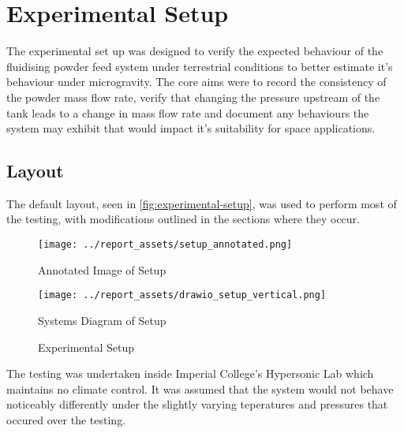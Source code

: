 \section{Experimental Setup}
The experimental set up was designed to verify the expected behaviour of the fluidising powder feed system under terrestrial conditions to better estimate it's behaviour under microgravity. The core aims were to record the consistency of the powder mass flow rate, verify that changing the pressure upstream of the tank leads to a change in mass flow rate and document any behaviours the system may exhibit that would impact it's suitability for space applications.

\subsection{Layout}
The default layout, seen in \autoref{fig:experimental-setup}, was used to perform most of the testing, with modifications outlined in the sections where they occur. 
\begin{figure}[htbp]
    \centering

    \begin{minipage}{0.6\textwidth}
        \centering
        \texttt{[image: ../report\_assets/setup\_annotated.png]}
        \caption*{Annotated Image of Setup}
    \end{minipage}
    \hfill
    \begin{minipage}{0.3\textwidth}
        \centering
        \texttt{[image: ../report\_assets/drawio\_setup\_vertical.png]}
        \caption*{Systems Diagram of Setup}
    \end{minipage}
    \caption{Experimental Setup}\label{fig:experimental-setup}
\end{figure}
The testing was undertaken inside Imperial College's Hypersonic Lab which maintains no climate control. It was assumed that the system would not behave noticeably differently under the slightly varying teperatures and pressures that occured over the testing.

